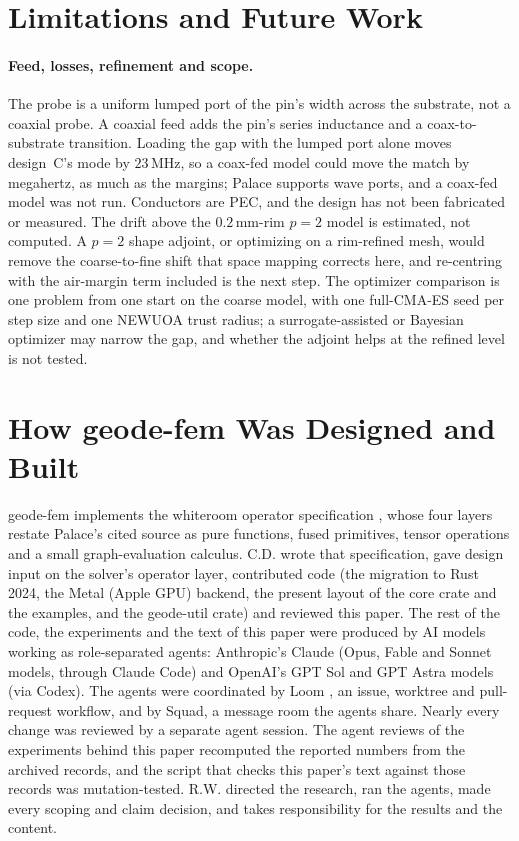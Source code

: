 \documentclass{anvil-paper}
\begin{document}
\section{Limitations and Future Work}
\label{sec:limits}

\paragraph{Feed, losses, refinement and scope.}
The probe is a uniform lumped port of the pin's width across the substrate,
not a coaxial probe. A coaxial feed adds the pin's series inductance and a
coax-to-substrate transition. Loading the gap with the lumped port alone
moves design~C's mode by $23$\,MHz, so a coax-fed model could move the
match by megahertz, as much as the margins; Palace supports wave ports, and
a coax-fed model was not run. Conductors are PEC, and the design has not
been fabricated or measured.
The drift above the $0.2$\,mm-rim $p = 2$ model is estimated, not computed.
A $p = 2$ shape adjoint, or optimizing on a rim-refined mesh, would remove
the coarse-to-fine shift that space mapping corrects here, and re-centring
with the air-margin term included is the next step. The optimizer
comparison is one problem from one start on the coarse model, with one
full-CMA-ES seed per step size and one NEWUOA trust radius; a
surrogate-assisted or Bayesian optimizer may narrow the gap, and whether the
adjoint helps at the refined level is not tested.

\section{How geode-fem Was Designed and Built}
\label{sec:built}

geode-fem implements the whiteroom operator specification
\citep{dunnavant2026whiteroom}, whose four layers restate Palace's cited
source as pure functions, fused primitives, tensor operations and a small
graph-evaluation calculus. C.D. wrote that specification, gave design input
on the solver's operator layer, contributed code (the migration to Rust
2024, the Metal (Apple GPU) backend, the present layout of the core crate
and the examples, and the geode-util crate) and reviewed this paper. The
rest of the code, the experiments and the text of this paper were produced
by AI models working as role-separated agents: Anthropic's Claude (Opus,
Fable and Sonnet models, through Claude Code) and OpenAI's GPT Sol and GPT
Astra models (via Codex). The agents were coordinated by Loom
\citep{loom}, an issue, worktree and pull-request workflow, and by Squad,
a message room the agents share. Nearly every change was reviewed by a
separate agent session. The agent reviews of the experiments behind this
paper recomputed the reported numbers from the archived records, and the
script that checks this paper's text against those records was
mutation-tested. R.W. directed the research, ran the agents, made every
scoping and claim decision, and takes responsibility for the results and
the content.
\end{document}
